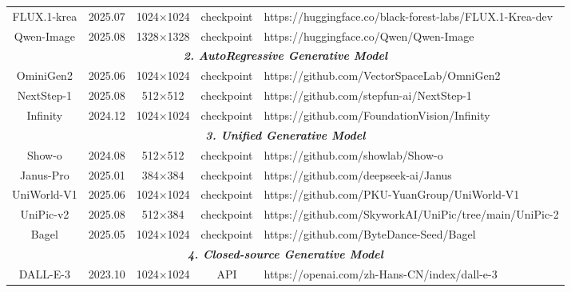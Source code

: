 \documentclass{article}
\begin{document}
\begin{table}[t]
{\begin{tabular}{cc|ccl}
        \multicolumn{1}{c|}{FLUX.1-krea} & 2025.07 & \multicolumn{1}{c|}{1024$\times$1024} & \multicolumn{1}{c|}{checkpoint} & https://huggingface.co/black-forest-labs/FLUX.1-Krea-dev \\
        \multicolumn{1}{c|}{Qwen-Image} & 2025.08 & \multicolumn{1}{c|}{1328$\times$1328} & \multicolumn{1}{c|}{checkpoint} & https://huggingface.co/Qwen/Qwen-Image \\ 
        \hline
        \multicolumn{5}{c}{\textit{\textbf{2. AutoRegressive Generative Model}}} \\ 
        \hline
        \multicolumn{1}{c|}{OminiGen2} & 2025.06 & \multicolumn{1}{c|}{1024$\times$1024} & \multicolumn{1}{c|}{checkpoint} & https://github.com/VectorSpaceLab/OmniGen2 \\
        \multicolumn{1}{c|}{NextStep-1} & 2025.08 & \multicolumn{1}{c|}{512$\times$512} & \multicolumn{1}{c|}{checkpoint} & https://github.com/stepfun-ai/NextStep-1 \\
        \multicolumn{1}{c|}{Infinity} & 2024.12 & \multicolumn{1}{c|}{1024$\times$1024} & \multicolumn{1}{c|}{checkpoint} & https://github.com/FoundationVision/Infinity \\ 
        \hline
        \multicolumn{5}{c}{\textit{\textbf{3. Unified Generative Model}}} \\ 
        \hline
        \multicolumn{1}{c|}{Show-o} & 2024.08 & \multicolumn{1}{c|}{512$\times$512} & \multicolumn{1}{c|}{checkpoint} & https://github.com/showlab/Show-o \\
        \multicolumn{1}{c|}{Janus-Pro} & 2025.01 & \multicolumn{1}{c|}{384$\times$384} & \multicolumn{1}{c|}{checkpoint} & https://github.com/deepseek-ai/Janus \\
        \multicolumn{1}{c|}{UniWorld-V1} & 2025.06 & \multicolumn{1}{c|}{1024$\times$1024} & \multicolumn{1}{c|}{checkpoint} & https://github.com/PKU-YuanGroup/UniWorld-V1 \\
        \multicolumn{1}{c|}{UniPic-v2} & 2025.08 & \multicolumn{1}{c|}{512$\times$384} & \multicolumn{1}{c|}{checkpoint} & https://github.com/SkyworkAI/UniPic/tree/main/UniPic-2 \\
        \multicolumn{1}{c|}{Bagel} & 2025.05 & \multicolumn{1}{c|}{1024$\times$1024} & \multicolumn{1}{c|}{checkpoint} & https://github.com/ByteDance-Seed/Bagel \\ 
        \hline
        \multicolumn{5}{c}{\textit{\textbf{4. Closed-source Generative Model}}} \\ 
        \hline
        \multicolumn{1}{c|}{DALL-E-3} & 2023.10 & \multicolumn{1}{c|}{1024$\times$1024} & \multicolumn{1}{c|}{API} & https://openai.com/zh-Hans-CN/index/dall-e-3 \\

\end{tabular}}
\end{table}
\end{document}

